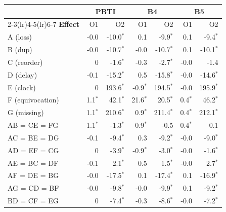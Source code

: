 \begin{tabular}{lrrrrrr}
\toprule
& \multicolumn{2}{c}{\textbf{PBTI}} & \multicolumn{2}{c}{\textbf{B4}} & \multicolumn{2}{c}{\textbf{B5}}\\
\cmidrule(lr){2-3}\cmidrule(lr){4-5}\cmidrule(lr){6-7}
\textbf{Effect} & O1 & O2 & O1 & O2 & O1 & O2\\
\midrule
A (loss) & -0.0 & -10.0$^{*}$ & 0.1 & -9.9$^{*}$ & 0.1 & -9.4$^{*}$\\
B (dup) & -0.0 & -10.7$^{*}$ & -0.0 & -10.7$^{*}$ & 0.1 & -10.1$^{*}$\\
C (reorder) & 0 & -1.6$^{*}$ & -0.3 & -2.7$^{*}$ & -0.0 & -1.4\\
D (delay) & -0.1 & -15.2$^{*}$ & 0.5 & -15.8$^{*}$ & -0.0 & -14.6$^{*}$\\
E (clock) & 0 & 193.6$^{*}$ & -0.9$^{*}$ & 194.5$^{*}$ & -0.0 & 195.9$^{*}$\\
F (equivocation) & 1.1$^{*}$ & 42.1$^{*}$ & 21.6$^{*}$ & 20.5$^{*}$ & 0.4$^{*}$ & 46.2$^{*}$\\
G (missing) & 1.1$^{*}$ & 210.6$^{*}$ & 0.9$^{*}$ & 211.4$^{*}$ & 0.4$^{*}$ & 212.1$^{*}$\\
AB = CE = FG & 1.1$^{*}$ & -1.3$^{*}$ & 0.9$^{*}$ & -0.5 & 0.4$^{*}$ & 0.1\\
AC = BE = DG & -0.1 & -9.4$^{*}$ & 0.3 & -9.2$^{*}$ & -0.0 & -9.0$^{*}$\\
AD = EF = CG & 0 & -3.9$^{*}$ & -0.9$^{*}$ & -3.0$^{*}$ & -0.0 & -1.6$^{*}$\\
AE = BC = DF & -0.1 & 2.1$^{*}$ & 0.5 & 1.5$^{*}$ & -0.0 & 2.7$^{*}$\\
AF = DE = BG & -0.0 & -17.5$^{*}$ & 0.1 & -17.4$^{*}$ & 0.1 & -16.9$^{*}$\\
AG = CD = BF & -0.0 & -9.8$^{*}$ & -0.0 & -9.9$^{*}$ & 0.1 & -9.2$^{*}$\\
BD = CF = EG & 0 & -7.4$^{*}$ & -0.3 & -8.6$^{*}$ & -0.0 & -7.2$^{*}$\\
\bottomrule
\end{tabular}